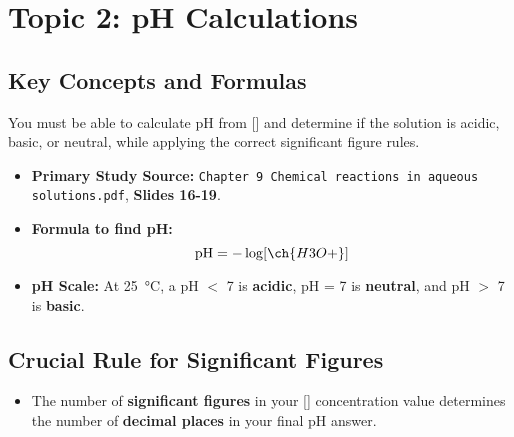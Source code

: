 \documentclass{article}
\begin{document}
\section*{Topic 2: pH Calculations}

\subsection*{Key Concepts and Formulas}
You must be able to calculate pH from [] and determine if the solution is acidic, basic, or neutral, while applying the correct significant figure rules.
\begin{itemize}[itemsep=5pt]
    \item \textbf{Primary Study Source:} \texttt{Chapter 9 Chemical reactions in aqueous solutions.pdf}, \textbf{Slides 16-19}.
    \item \textbf{Formula to find pH:} \[ \text{pH} = -\log[\ch{H3O+}] \]
    \item \textbf{pH Scale:} At \SI{25}{\celsius}, a pH $<$ 7 is \textbf{acidic}, pH = 7 is \textbf{neutral}, and pH $>$ 7 is \textbf{basic}.
\end{itemize}

\subsection*{Crucial Rule for Significant Figures}
\begin{itemize}[itemsep=5pt]
    \item The number of \textbf{significant figures} in your [] concentration value determines the number of \textbf{decimal places} in your final pH answer.
\end{itemize}
\end{document}

